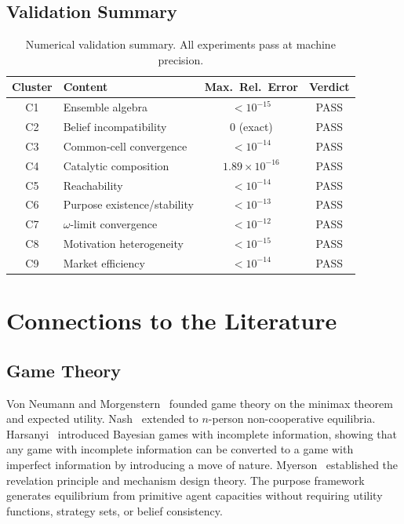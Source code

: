 \documentclass[twocolumn,11pt,a4paper]{article}
\theoremstyle{remark}
\begin{document}
\subsection*{Validation Summary}

\begin{table}[h]
\centering
\caption{Numerical validation summary. All experiments pass at machine precision.}
\label{tab:validation}
\small
\begin{tabular}{@{}clcc@{}}
\toprule
Cluster & Content & Max.\ Rel.\ Error & Verdict \\
\midrule
C1 & Ensemble algebra & $< 10^{-15}$ & PASS \\
C2 & Belief incompatibility & $0$ (exact) & PASS \\
C3 & Common-cell convergence & $< 10^{-14}$ & PASS \\
C4 & Catalytic composition & $1.89 \times 10^{-16}$ & PASS \\
C5 & Reachability & $< 10^{-14}$ & PASS \\
C6 & Purpose existence/stability & $< 10^{-13}$ & PASS \\
C7 & $\omega$-limit convergence & $< 10^{-12}$ & PASS \\
C8 & Motivation heterogeneity & $< 10^{-15}$ & PASS \\
C9 & Market efficiency & $< 10^{-14}$ & PASS \\
\bottomrule
\end{tabular}
\end{table}

\section{Connections to the Literature}
\label{sec:literature}

\subsection{Game Theory}
\label{sec:lit:game}

Von Neumann and Morgenstern~\cite{vnm1944} founded game theory on the
minimax theorem and expected utility.  Nash~\cite{nash1950,nash1951} extended
to $n$-person non-cooperative equilibria.  Harsanyi~\cite{harsanyi1967}
introduced Bayesian games with incomplete information, showing that any
game with incomplete information can be converted to a game with imperfect
information by introducing a move of nature.  Myerson~\cite{myerson1979}
established the revelation principle and mechanism design theory.
The purpose framework generates equilibrium from primitive agent capacities
without requiring utility functions, strategy sets, or belief consistency.
\end{document}
